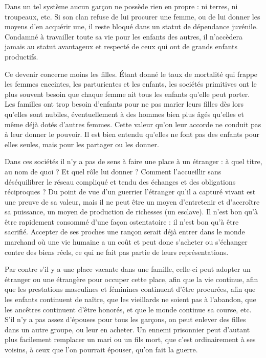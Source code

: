 Dans un tel système aucun garçon ne possède rien en propre : ni terres, ni troupeaux, etc. Si son clan refuse de lui procurer une femme, ou de lui donner les moyens d'en acquérir une, il reste bloqué dans un statut de dépendance juvénile. Condamné à travailler toute sa vie pour les enfants des autres, il n'accèdera jamais au statut avantageux et respecté de ceux qui ont de grands enfants productifs.

Ce devenir concerne moins les filles. Étant donné le taux de mortalité qui frappe les femmes enceintes, les parturientes et les enfants, les sociétés primitives ont le plus souvent besoin que chaque femme ait tous les enfants qu'elle peut porter. Les familles ont trop besoin d'enfants pour ne pas marier leurs filles dès lors qu'elles sont nubiles, éventuellement à des hommes bien plus âgés qu'elles et même déjà dotés d'autres femmes. Cette valeur qu'on leur accorde ne conduit pas à leur donner le pouvoir. Il est bien entendu qu'elles ne font pas des enfants pour elles seules, mais pour les partager ou les donner. 

Dans ces sociétés il n'y a pas de sens à faire une place à un étranger : à quel titre, au nom de quoi ? Et quel rôle lui donner ? Comment l'accueillir sans déséquilibrer le réseau compliqué et tendu des échanges et des obligations réciproques ? Du point de vue d'un guerrier l'étranger qu’il a capturé vivant est une preuve de sa valeur, mais il ne peut être un moyen d'entretenir et d'accroître sa puissance, un moyen de production de richesses (un esclave). Il n'est bon qu'à être rapidement consommé d'une façon ostentatoire : il n'est bon qu'à être sacrifié. Accepter de ses proches une rançon serait déjà entrer dans le monde marchand où une vie humaine a un coût et peut donc s'acheter ou s'échanger contre des biens réels, ce qui ne fait pas partie de leurs représentations.

Par contre s'il y a une place vacante dans une famille, celle-ci peut adopter un étranger ou une étrangère pour occuper cette place, afin que la vie continue, afin que les prestations masculines et féminines continuent d'être procurées, afin que les enfants continuent de naître, que les vieillards ne soient pas à l'abandon, que les ancêtres continuent d'être honorés, et que le monde continue sa course, etc. S'il n'y a pas assez d'épouses pour tous les garçons, on peut enlever des filles dans un autre groupe, ou leur en acheter. Un ennemi prisonnier peut d'autant plus facilement remplacer un mari ou un fils mort, que c'est ordinairement à ses voisins, à ceux que l'on pourrait épouser, qu'on fait la guerre.

